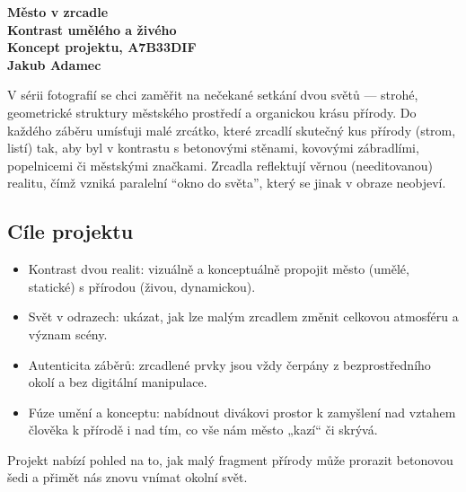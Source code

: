 \documentclass[12pt]{article}
\begin{document}
\begin{center}
    \Huge\bfseries\color{DarkGray} {Město v zrcadle} \\
    \Large \textbf{Kontrast umělého a živého} \\ 
    \normalsize Koncept projektu, A7B33DIF \\
    Jakub Adamec
\end{center}

V sérii fotografií se chci zaměřit na nečekané setkání dvou světů --- strohé, geometrické struktury městského prostředí 
a organickou krásu přírody. Do každého záběru umísťuji malé zrcátko, které zrcadlí skutečný kus přírody (strom, listí) 
tak, aby byl v kontrastu s betonovými stěnami, kovovými zábradlími, popelnicemi či městskými značkami. Zrcadla 
reflektují věrnou (needitovanou) realitu, čímž vzniká paralelní \enquote{okno do světa}, který se jinak v obraze 
neobjeví.

\subsection*{Cíle projektu}
\begin{itemize}
    \item Kontrast dvou realit: vizuálně a konceptuálně propojit město (umělé, statické) s přírodou (živou, dynamickou).
    \item Svět v odrazech: ukázat, jak lze malým zrcadlem změnit celkovou atmosféru a význam scény.
    \item Autenticita záběrů: zrcadlené prvky jsou vždy čerpány z bezprostředního okolí a bez digitální manipulace.
    \item Fúze umění a konceptu: nabídnout divákovi prostor k zamyšlení nad vztahem člověka k přírodě i nad tím, co vše 
    nám město „kazí“ či skrývá.
\end{itemize}

Projekt nabízí pohled na to, jak malý fragment přírody může prorazit betonovou šedi a přimět nás znovu vnímat okolní 
svět.
\end{document}
